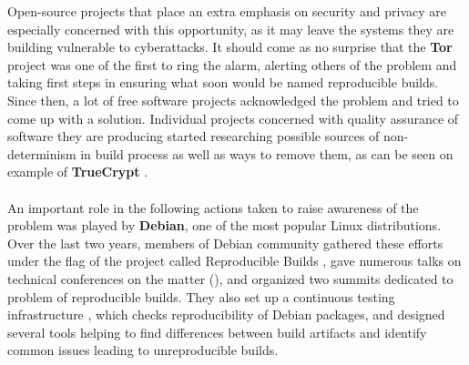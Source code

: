 {Open-source projects that place an extra emphasis on security
and privacy are especially concerned with this opportunity, as
it may leave the systems they are building vulnerable to cyberattacks.
It should come as no surprise that the \textbf{Tor} project was one of the
first to ring the alarm, alerting others of the problem and taking first steps
in ensuring what soon would be named reproducible builds\cite{tor13, tor14}.
Since then, a lot of free software projects acknowledged the problem and
tried to come up with a solution. Individual projects concerned with quality
assurance of software they are producing started researching possible sources of
non-determinism in build process as well as ways to remove them, as can be
seen on example of \textbf{TrueCrypt} \cite{de2014challenges}.\\\\
An important role in the following actions taken to raise awareness of the
problem was played by \textbf{Debian}, one of the most popular Linux distributions.
Over the last two years, members of Debian community gathered these efforts
under the flag of the project called Reproducible Builds \cite{Rb},
gave numerous talks on technical conferences on the matter
(\citep{Lun14, lca2017_valerie}), and organized
two summits dedicated to problem of reproducible builds. They also set up a continuous
testing infrastructure \cite{tests-rbo}, which checks reproducibility
of Debian packages, and designed several tools helping to find
differences between build artifacts and identify common issues leading to
unreproducible builds.}
